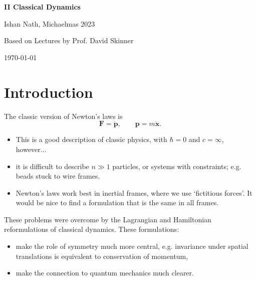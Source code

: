 \documentclass[12pt]{article}
\begin{document}
\hypersetup{pageanchor=false}
\begin{titlepage}
	\begin{center}
		\vspace*{1em}
		\Huge
		\textbf{II Classical Dynamics}

		\vspace{1em}
		\large
		Ishan Nath, Michaelmas 2023

		\vspace{1.5em}

		\Large

		Based on Lectures by Prof. David Skinner

		\vspace{1em}

		\large
		\today
	\end{center}
	
\end{titlepage}
\hypersetup{pageanchor=true}

\tableofcontents

\newpage

\section{Introduction}
\label{sec:intro}

The classic version of Newton's laws is
\[
\mathbf{F} = \mathbf{\dot p}, \qquad \mathbf{p} = m \mathbf{\dot x}.
\]

\begin{itemize}
	\item This is a good description of classic physics, with $\hbar = 0$ and $c = \infty$, however...
	\item it is difficult to describe $n \gg 1$ particles, or systems with constraints; e.g. beads stuck to wire frames.
	\item Newton's laws work best in inertial frames, where we use `fictitious forces'. It would be nice to find a formulation that is the same in all frames.
\end{itemize}

These problems were overcome by the Lagrangian and Hamiltonian reformulations of classical dynamics. These formulations:
\begin{itemize}
	\item make the role of symmetry much more central, e.g. invariance under spatial translations is equivalent to conservation of momentum,
	\item make the connection to quantum mechanics much clearer.
\end{itemize}
\end{document}
